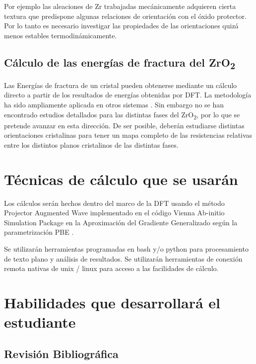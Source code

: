 Por ejemplo las aleaciones de Zr trabajadas mecánicamente adquieren
cierta textura \cite{Malamud2018,Gloaguen2010} que predispone algunas relaciones de orientación 
con el óxido protector. Por lo tanto es necesario investigar las propiedades de las orientaciones
quizá menos estables termodinámicamente. 

\subsection{Cálculo de las energías de fractura del ZrO\textsubscript{2}}

Las Energías de fractura de un cristal pueden obtenerse mediante un cálculo directo 
a partir de los resultados de energías obtenidas por DFT. La metodología ha sido 
ampliamente aplicada en otros sistemas \cite{Liao2010, Liao2010a, Forti2016}. Sin embargo 
no se han encontrado estudios detallados para las distintas fases del ZrO\textsubscript{2}, 
por lo que se pretende avanzar en esta dirección. De ser posible, deberán estudiarse distintas
orientaciones cristalinas para tener un mapa completo de las resistencias relativas entre
los distintos planos cristalinos de las distintas fases. 

\section{Técnicas de cálculo que se usarán}

Los cálculos serán hechos dentro del marco de la DFT \cite{KohnSham65,
HohenbergKohn64} usando el método 
Projector Augmented Wave\cite{Bloch1994,Kresse1999}
implementado en el código Vienna Ab-initio 
Simulation Package\cite{Hafner2007,Hafner2008}
en la Aproximación del Gradiente Generalizado según la 
parametrización PBE \cite{PBE}. 

Se utilizarán herramientas programadas en bash y/o python para procesamiento de 
texto plano y análisis de resultados. Se utilizarán herramientas de conexión 
remota nativas de unix / linux para acceso a las facilidades de cálculo.

\section{Habilidades que desarrollará el estudiante}

\subsection{ Revisión Bibliográfica}

